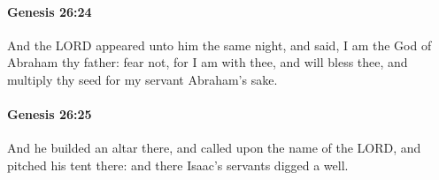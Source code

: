 		\paragraph{Genesis 26:24} %
			\label{GENESIS-26-24}

			And the LORD appeared unto him the same night, and said, I am the God of Abraham thy father: fear not, for I am with thee, and will bless thee, and multiply thy seed for my servant Abraham's sake.


		\paragraph{Genesis 26:25} %
			\label{GENESIS-26-25}

			And he builded an altar there, and called upon the name of the LORD, and pitched his tent there: and there Isaac's servants digged a well.



